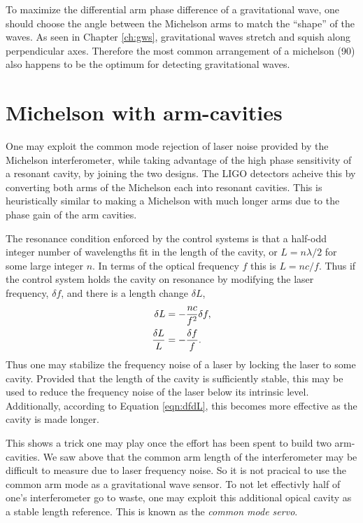 To maximize the differential arm phase difference of a gravitational wave, one should choose the angle between the Michelson arms to match the ``shape'' %
of the waves. %
As seen in Chapter \ref{ch:gws}, gravitational waves stretch and squish along perpendicular axes. %
Therefore the most common arrangement of a michelson (90\degrees{}) also happens to be the optimum for detecting gravitational waves.

\section{Michelson with arm-cavities}
\label{sec:armcav}
One may exploit the common mode rejection of laser noise provided by the Michelson interferometer, while taking advantage of the high phase sensitivity of a resonant cavity, by joining the two designs. %
The LIGO detectors acheive this by converting both arms of the Michelson each into resonant cavities. %
This is heuristically similar to making a Michelson with much longer arms due to the phase gain of the arm cavities.

The resonance condition enforced by the control systems is that a half-odd integer number of wavelengths fit in the length of the cavity, or $L=n\lambda/2$ for some large integer $n$. %
In terms of the optical frequency $f$ this is $L=nc/f$. %
Thus if the control system holds the cavity on resonance by modifying the laser frequency, $\delta f$, and there is a length change $\delta L$,
\begin{align}
\delta L &= -\frac{nc}{f^2}\delta f,\notag \\
\frac{\delta L}{L} &= -\frac{\delta f}{f}.
\label{eqn:dfdL}
\end{align}
Thus one may stabilize the frequency noise of a laser by locking the laser to some cavity. %
Provided that the length of the cavity is sufficiently stable, this may be used to reduce the frequency noise of the laser below its intrinsic level. %
Additionally, according to Equation \ref{eqn:dfdL}, this becomes more effective as the cavity is made longer.

This shows a trick one may play once the effort has been spent to build two arm-cavities. %
We saw above that the common arm length of the interferometer may be difficult to measure due to laser frequency noise. %
So it is not pracical to use the common arm mode as a gravitational wave sensor. %
To not let effectivly half of one's interferometer go to waste, one may exploit this additional opical cavity as a stable length reference. %
This is known as the \emph{common mode servo}.

